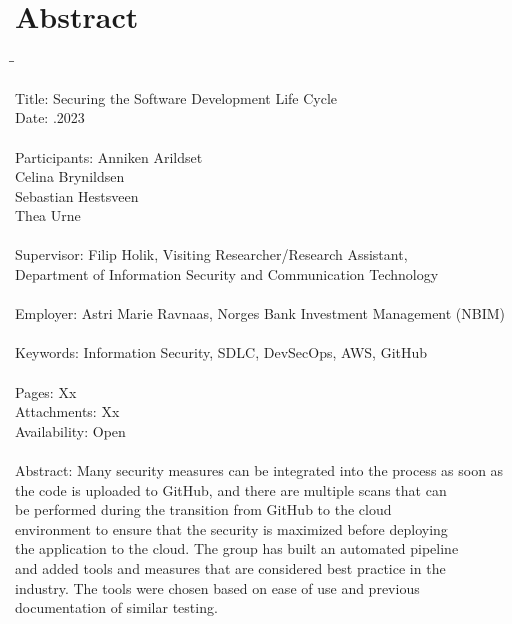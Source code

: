 \chapter*{Abstract}

\begin{tabbing}
\hspace{2cm}\=\hspace{3cm}\=\kill %

Title: \> \> Securing the Software Development Life Cycle \\
Date: \> .2023 \\ 
\\
Participants: \> \> Anniken Arildset \\ \> \> Celina Brynildsen \\ \> \> Sebastian Hestsveen \\ \> \> Thea Urne \\
\\
Supervisor: \> \> Filip Holik, Visiting Researcher/Research Assistant, \\\> \> Department of Information Security and Communication Technology \\
\\
Employer: \> \>  Astri Marie Ravnaas, Norges Bank Investment Management (NBIM) \\
\\
Keywords: \> \> Information Security, SDLC, DevSecOps, AWS, GitHub \\
\\
Pages: \> \> Xx \\
Attachments: \> \> Xx \\
Availability: \> \> Open \\
\\
Abstract: \> \> Many security measures can be integrated into the process as soon as\\ \> \> the  code is uploaded to GitHub, and there are multiple scans that can\\ \> \> be performed during the transition from GitHub to the cloud\\ \> \> environment to ensure that the security is maximized before deploying\\ \> \>  the application to the cloud. The group has built an automated pipeline \\ \> \>and added tools and measures that are considered best practice in the\\ \> \> industry. The tools were chosen based on ease of use and previous \\ \> \>documentation of similar testing. 



\end{tabbing}
